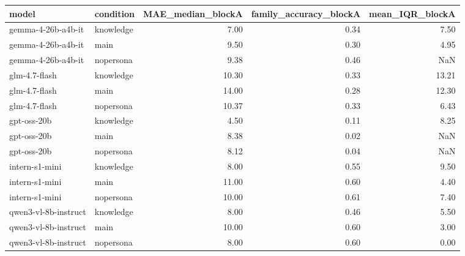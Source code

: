 \begin{tabular}{llrrr}
\toprule
model & condition & MAE\_median\_blockA & family\_accuracy\_blockA & mean\_IQR\_blockA \\
\midrule
gemma-4-26b-a4b-it & knowledge & 7.00 & 0.34 & 7.50 \\
gemma-4-26b-a4b-it & main & 9.50 & 0.30 & 4.95 \\
gemma-4-26b-a4b-it & nopersona & 9.38 & 0.46 & NaN \\
glm-4.7-flash & knowledge & 10.30 & 0.33 & 13.21 \\
glm-4.7-flash & main & 14.00 & 0.28 & 12.30 \\
glm-4.7-flash & nopersona & 10.37 & 0.33 & 6.43 \\
gpt-oss-20b & knowledge & 4.50 & 0.11 & 8.25 \\
gpt-oss-20b & main & 8.38 & 0.02 & NaN \\
gpt-oss-20b & nopersona & 8.12 & 0.04 & NaN \\
intern-s1-mini & knowledge & 8.00 & 0.55 & 9.50 \\
intern-s1-mini & main & 11.00 & 0.60 & 4.40 \\
intern-s1-mini & nopersona & 10.00 & 0.61 & 7.40 \\
qwen3-vl-8b-instruct & knowledge & 8.00 & 0.46 & 5.50 \\
qwen3-vl-8b-instruct & main & 10.00 & 0.60 & 3.00 \\
qwen3-vl-8b-instruct & nopersona & 8.00 & 0.60 & 0.00 \\
\bottomrule
\end{tabular}
